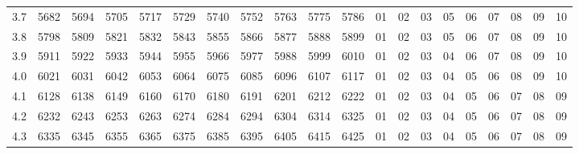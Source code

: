 \documentclass[12pt,UTF8,fontset=none]{ctexbook}
\begin{document}
\begin{appendix}
\begin{longtable}{|c| c c c c c | c c c c c| c c c c c c c c c|}
\scriptsize 3.7 & \scriptsize 5682 & \scriptsize 5694 & \scriptsize 5705 & \scriptsize 5717 & \scriptsize 5729 & \scriptsize 5740 & \scriptsize 5752 & \scriptsize 5763 & \scriptsize 5775 & \scriptsize 5786 & \scriptsize 01 & \scriptsize 02 & \scriptsize 03 & \scriptsize 05 & \scriptsize 06 & \scriptsize 07 & \scriptsize 08 & \scriptsize 09 & \scriptsize 10 \\
\scriptsize 3.8 & \scriptsize 5798 & \scriptsize 5809 & \scriptsize 5821 & \scriptsize 5832 & \scriptsize 5843 & \scriptsize 5855 & \scriptsize 5866 & \scriptsize 5877 & \scriptsize 5888 & \scriptsize 5899 & \scriptsize 01 & \scriptsize 02 & \scriptsize 03 & \scriptsize 05 & \scriptsize 06 & \scriptsize 07 & \scriptsize 08 & \scriptsize 09 & \scriptsize 10 \\
\scriptsize 3.9 & \scriptsize 5911 & \scriptsize 5922 & \scriptsize 5933 & \scriptsize 5944 & \scriptsize 5955 & \scriptsize 5966 & \scriptsize 5977 & \scriptsize 5988 & \scriptsize 5999 & \scriptsize 6010 & \scriptsize 01 & \scriptsize 02 & \scriptsize 03 & \scriptsize 04 & \scriptsize 06 & \scriptsize 07 & \scriptsize 08 & \scriptsize 09 & \scriptsize 10 \\
\scriptsize 4.0 & \scriptsize 6021 & \scriptsize 6031 & \scriptsize 6042 & \scriptsize 6053 & \scriptsize 6064 & \scriptsize 6075 & \scriptsize 6085 & \scriptsize 6096 & \scriptsize 6107 & \scriptsize 6117 & \scriptsize 01 & \scriptsize 02 & \scriptsize 03 & \scriptsize 04 & \scriptsize 05 & \scriptsize 06 & \scriptsize 08 & \scriptsize 09 & \scriptsize 10 \\
\scriptsize 4.1 & \scriptsize 6128 & \scriptsize 6138 & \scriptsize 6149 & \scriptsize 6160 & \scriptsize 6170 & \scriptsize 6180 & \scriptsize 6191 & \scriptsize 6201 & \scriptsize 6212 & \scriptsize 6222 & \scriptsize 01 & \scriptsize 02 & \scriptsize 03 & \scriptsize 04 & \scriptsize 05 & \scriptsize 06 & \scriptsize 07 & \scriptsize 08 & \scriptsize 09 \\
\scriptsize 4.2 & \scriptsize 6232 & \scriptsize 6243 & \scriptsize 6253 & \scriptsize 6263 & \scriptsize 6274 & \scriptsize 6284 & \scriptsize 6294 & \scriptsize 6304 & \scriptsize 6314 & \scriptsize 6325 & \scriptsize 01 & \scriptsize 02 & \scriptsize 03 & \scriptsize 04 & \scriptsize 05 & \scriptsize 06 & \scriptsize 07 & \scriptsize 08 & \scriptsize 09 \\
\scriptsize 4.3 & \scriptsize 6335 & \scriptsize 6345 & \scriptsize 6355 & \scriptsize 6365 & \scriptsize 6375 & \scriptsize 6385 & \scriptsize 6395 & \scriptsize 6405 & \scriptsize 6415 & \scriptsize 6425 & \scriptsize 01 & \scriptsize 02 & \scriptsize 03 & \scriptsize 04 & \scriptsize 05 & \scriptsize 06 & \scriptsize 07 & \scriptsize 08 & \scriptsize 09 \\

\end{longtable}
\end{appendix}
\end{document}
